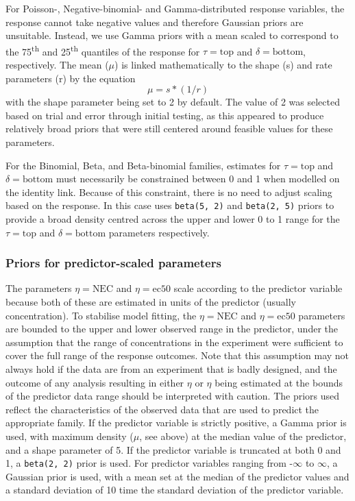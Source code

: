 \documentclass[
  shortnames]{jss}
\begin{document}
For Poisson-, Negative-binomial- and Gamma-distributed response variables, the response cannot take negative values and therefore Gaussian priors are unsuitable. Instead, we use Gamma priors with a mean scaled to correspond to the 75\textsuperscript{th} and 25\textsuperscript{th} quantiles of the response for \(\tau = \text{top}\) and \(\delta = \text{bottom}\), respectively. The mean (\(\mu\)) is linked mathematically to the shape (s) and rate parameters (r) by the equation \[ \mu = s * (1/r) \] \citep{Becker1988} with the shape parameter being set to 2 by default. The value of 2 was selected based on trial and error through initial testing, as this appeared to produce relatively broad priors that were still centered around feasible values for these parameters.

For the Binomial, Beta, and Beta-binomial families, estimates for \(\tau = \text{top}\) and \(\delta = \text{bottom}\) must necessarily be constrained between 0 and 1 when modelled on the identity link. Because of this constraint, there is no need to adjust scaling based on the response. In this case  uses \texttt{beta(5,\ 2)} and \texttt{beta(2,\ 5)} priors to provide a broad density centred across the upper and lower 0 to 1 range for the \(\tau = \text{top}\) and \(\delta = \text{bottom}\) parameters respectively.

\hypertarget{priors-for-predictor-scaled-parameters}{%
\subsubsection{Priors for predictor-scaled parameters}\label{priors-for-predictor-scaled-parameters}}

The parameters \(\eta = \text{NEC}\) and \(\eta = \text{ec50}\) scale according to the predictor variable because both of these are estimated in units of the predictor (usually concentration). To stabilise model fitting, the \(\eta = \text{NEC}\) and \(\eta = \text{ec50}\) parameters are bounded to the upper and lower observed range in the predictor, under the assumption that the range of concentrations in the experiment were sufficient to cover the full range of the response outcomes. Note that this assumption may not always hold if the data are from an experiment that is badly designed, and the outcome of any analysis resulting in either \(\eta\) or \(\eta\) being estimated at the bounds of the predictor data range should be interpreted with caution. The priors used reflect the characteristics of the observed data that are used to predict the appropriate family. If the predictor variable is strictly positive, a Gamma prior is used, with maximum density (\(\mu\), see above) at the median value of the predictor, and a shape parameter of 5. If the predictor variable is truncated at both 0 and 1, a \texttt{beta(2,\ 2)} prior is used. For predictor variables ranging from -\(\infty\) to \(\infty\), a Gaussian prior is used, with a mean set at the median of the predictor values and a standard deviation of 10 time the standard deviation of the predictor variable.
\end{document}
